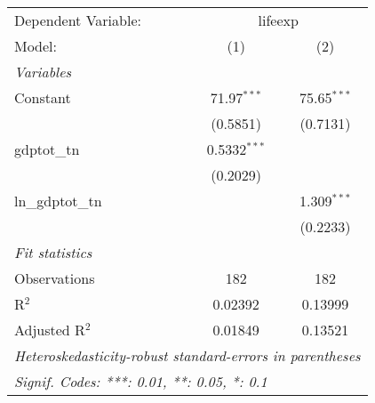 \begingroup
\centering
\begin{tabular}{lcc}
   \tabularnewline \midrule \midrule
   Dependent Variable: & \multicolumn{2}{c}{lifeexp}\\
   Model:           & (1)            & (2)\\  
   \midrule
   \emph{Variables}\\
   Constant         & 71.97$^{***}$  & 75.65$^{***}$\\   
                    & (0.5851)       & (0.7131)\\   
   gdptot\_tn       & 0.5332$^{***}$ &   \\   
                    & (0.2029)       &   \\   
   ln\_gdptot\_tn   &                & 1.309$^{***}$\\   
                    &                & (0.2233)\\   
   \midrule
   \emph{Fit statistics}\\
   Observations     & 182            & 182\\  
   R$^2$            & 0.02392        & 0.13999\\  
   Adjusted R$^2$   & 0.01849        & 0.13521\\  
   \midrule \midrule
   \multicolumn{3}{l}{\emph{Heteroskedasticity-robust standard-errors in parentheses}}\\
   \multicolumn{3}{l}{\emph{Signif. Codes: ***: 0.01, **: 0.05, *: 0.1}}\\
\end{tabular}
\par\endgroup




